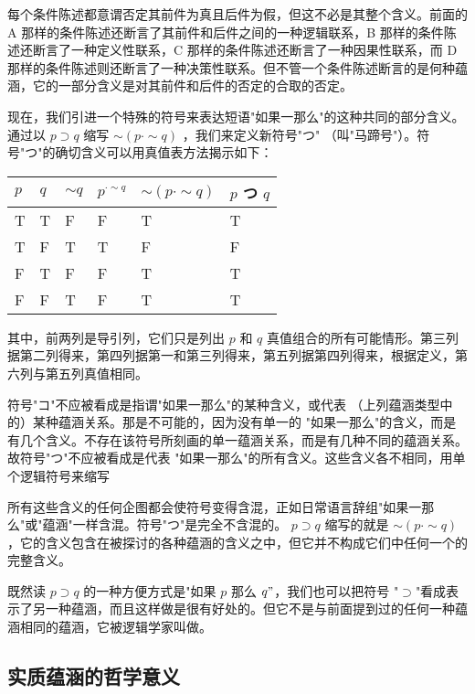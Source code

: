 每个条件陈述都意谓否定其前件为真且后件为假，但这不必是其整个含义。前面的 A 那样的条件陈述还断言了其前件和后件之间的一种逻辑联系，B 那样的条件陈述还断言了一种定义性联系，C 那样的条件陈述还断言了一种因果性联系，而 D 那样的条件陈述则还断言了一种决策性联系。但不管一个条件陈述断言的是何种蕴涵，它的一部分含义是对其前件和后件的否定的合取的否定。

现在，我们引进一个特殊的符号来表达短语"如果一那么"的这种共同的部分含义。通过以 $p \supset q$ 缩写 $\sim(p \cdot \sim q)$ ，我们来定义新符号"つ" （叫"马蹄号"）。符号"つ"的确切含义可以用真值表方法揭示如下：

\begin{center}
\begin{tabular}{|l|l|l|l|l|l|}
\hline
$p$ & $q$ & $\sim q$ & $p^{\cdot \sim q}$ & $\sim(p \cdot \sim q)$ & $p$ つ $q$ \\
\hline
T & T & F & F & T & T \\
\hline
T & F & T & T & F & F \\
\hline
F & T & F & F & T & T \\
\hline
F & F & T & F & T & T \\
\hline
\end{tabular}
\end{center}

其中，前两列是导引列，它们只是列出 $p$ 和 $q$ 真值组合的所有可能情形。第三列据第二列得来，第四列据第一和第三列得来，第五列据第四列得来，根据定义，第六列与第五列真值相同。

符号"コ"不应被看成是指谓"如果一那么"的某种含义，或代表 （上列蕴涵类型中的）某种蕴涵关系。那是不可能的，因为没有单一的 "如果一那么"的含义，而是有几个含义。不存在该符号所刻画的单一蕴涵关系，而是有几种不同的蕴涵关系。故符号"つ"不应被看成是代表 "如果一那么"的所有含义。这些含义各不相同，用单个逻辑符号来缩写

所有这些含义的任何企图都会使符号变得含混，正如日常语言辞组"如果一那么"或"蕴涵"一样含混。符号"つ"是完全不含混的。 $p \supset q$ 缩写的就是 $\sim(p \cdot \sim q)$ ，它的含义包含在被探讨的各种蕴涵的含义之中，但它并不构成它们中任何一个的完整含义。

既然读 $p \supset q$ 的一种方便方式是"如果 $p$ 那么 $q"$，我们也可以把符号 "$\supset$"看成表示了另一种蕴涵，而且这样做是很有好处的。但它不是与前面提到过的任何一种蕴涵相同的蕴涵，它被逻辑学家叫做。

\subsection{实质蕴涵的哲学意义}


